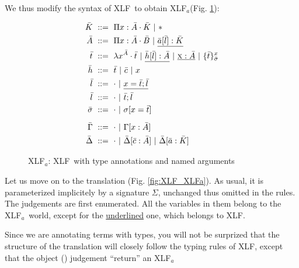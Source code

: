 \documentclass[preprint]{sigplanconf}
\newcommand\memph[1]{\underline{#1}}
\newcommand\gor{\ |\ }
\newcommand\gequal{\ ::=\ }
\newcommand\meta[1]{\textsc{#1}}
\newcommand\typ[2]{{#1}:{#2}}
\newcommand\mv{x}
\newcommand\mmeta{\meta x}
\newcommand\postbinder{\cdot}
\newcommand\prd[2]{\Pi{#1}:{#2}\postbinder}
\newcommand\tlam[2]{\lambda{#1}^{#2}\postbinder}
\newcommand\lam{\tlam}
\newcommand\obox[3]{\{{#1}\}^{#2}_{#3}}
\newcommand\srt[1]{\mathsf{#1}}
\newcommand\type{\srt *}
\newcommand\laapp[3]{{#1}[{#2}]:{#3}}
\newcommand\lnil{\cdot}
\newcommand\lcons[2]{{#1};{#2}}
\newcommand\lncons[3]{{#1}={#2};{#3}}
\newcommand\enil\cdot
\newcommand\eent[1]{[{#1}]}
\newcommand\econs[2]{{#1}\eent{#2}}
\newcommand\ebinddecl[3]{\econs{#1}{{#2}:{#3}}}
\newcommand\snil\enil
\newcommand\sent[2]{[{#1}={#2}]}
\newcommand\scons[3]{{#1}\sent{#2}{#3}}
\newcommand\lang[1]{\textsf{#1}}
\newcommand\XLF{\lang{XLF}}
\newcommand\XLFa{\lang{XLF$_a$}}
\newcommand\XLFamod[1]{\bar{#1}}
\def\thelangmod{UNDEFINED}
\newcommand\mk{\thelangmod{K}}
\newcommand\mf{\thelangmod{A}}
\newcommand\mmf{\thelangmod{B}}
\newcommand\mo{\thelangmod{t}}
\newcommand\mh{\thelangmod{h}}
\newcommand\ma{\thelangmod{l}}
\newcommand\ms{\thelangmod{\sigma}}
\newcommand\me{\thelangmod{\Gamma}}
\newcommand\msi{\thelangmod{\Delta}}
\newcommand\mco{\thelangmod{c}}
\newcommand\mcf{\thelangmod{a}}
\begin{document}
We thus modify the syntax of \XLF\ to obtain \XLFa (Fig. \ref{fig:XLFa}):

\begin{figure}
  \def\thelangmod{\XLFamod}
  \begin{align*}
    \mk &\gequal { \prd\mv\mf\mk
      \gor \type } \\
    \mf &\gequal { \prd\mv\mf\mmf
      \gor \memph{\laapp\mcf\ma\mk} } \\
    \mo &\gequal { \lam\mv\mf\mo
      \gor \memph{\laapp\mh\ma\mf}
      \gor \memph{\typ\mmeta\mf}
      \gor \obox\mo\mv\ms } \\
    \mh &\gequal { \mo
      \gor \mco
      \gor \mv } \\
    \ma &\gequal {\lnil
      \gor \memph{\lncons \mv\mo\ma}} \\
    \ma &\gequal { \lnil
      \gor \lcons\mo\ma } \\
    \ms &\gequal { \snil
      \gor \scons \sigma\mv\mo } \\[0.5em]
    \me &\gequal { \enil
      \gor \ebinddecl \Gamma\mv\mf } \\
    \msi &\gequal { \enil
      \gor \ebinddecl\msi\mco\mf
      \gor \ebinddecl\msi\mcf\mk }
  \end{align*}
  \caption{\XLFa: \XLF\ with type annotations and named arguments}
\label{fig:XLFa}
\end{figure}
Let us move on to the translation (Fig. \ref{fig:XLF_XLFa}). As usual,
it is parameterized implicitely by a signature $\Sigma$, unchanged
thus omitted in the rules. The judgements are first enumerated. All
the variables in them belong to the \XLFa\ world, except for the
\underline{underlined} one, which belongs to \XLF.

Since we are annotating terms with types, you will not be surprized
that the structure of the translation will closely follow the typing
rules of \XLF, except that the object () judgement ``return'' an \XLFa %

\newcommand\repo{\mathcal R}
\end{document}

